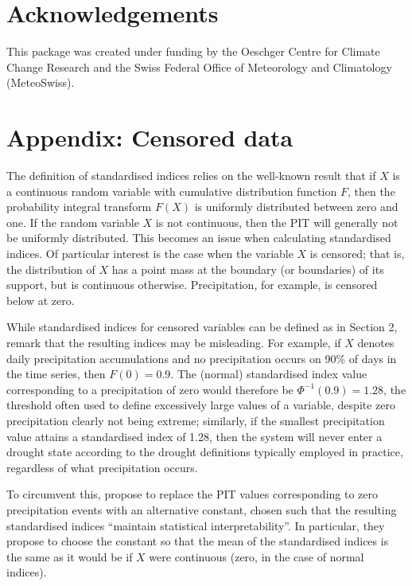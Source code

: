 \hypertarget{acknowledgements}{%
\section{Acknowledgements}\label{acknowledgements}}

This package was created under funding by the Oeschger Centre for Climate Change Research and the Swiss Federal Office of Meteorology and Climatology (MeteoSwiss).

\hypertarget{appendix-censored-data}{%
\section{Appendix: Censored data}\label{appendix-censored-data}}

The definition of standardised indices relies on the well-known result that if \(X\) is a continuous random variable with cumulative distribution function \(F\), then the probability integral transform \(F(X)\) is uniformly distributed between zero and one. If the random variable \(X\) is not continuous, then the PIT will generally not be uniformly distributed. This becomes an issue when calculating standardised indices. Of particular interest is the case when the variable \(X\) is censored; that is, the distribution of \(X\) has a point mass at the boundary (or boundaries) of its support, but is continuous otherwise. Precipitation, for example, is censored below at zero.

While standardised indices for censored variables can be defined as in Section 2, \cite{StaggeEtAl2015} remark that the resulting indices may be misleading. For example, if \(X\) denotes daily precipitation accumulations and no precipitation occurs on 90\% of days in the time series, then \(F(0) = 0.9\). The (normal) standardised index value corresponding to a precipitation of zero would therefore be \(\Phi^{-1}(0.9) = 1.28\), the threshold often used to define excessively large values of a variable, despite zero precipitation clearly not being extreme; similarly, if the smallest precipitation value attains a standardised index of 1.28, then the system will never enter a drought state according to the drought definitions typically employed in practice, regardless of what precipitation occurs.

To circumvent this, \cite{StaggeEtAl2015} propose to replace the PIT values corresponding to zero precipitation events with an alternative constant, chosen such that the resulting standardised indices ``maintain statistical interpretability''. In particular, they propose to choose the constant so that the mean of the standardised indices is the same as it would be if \(X\) were continuous (zero, in the case of normal indices).

